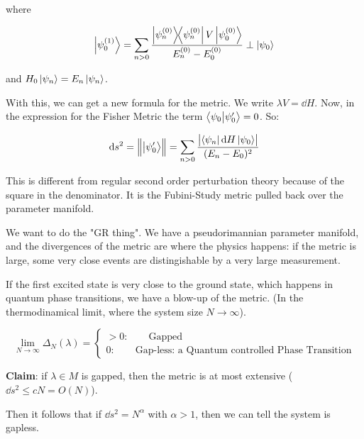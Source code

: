 \documentclass[main_zanardi.tex]{subfiles}
\begin{document}
where

\begin{equation}
  \ket{\psi_0 ^{(1)} } = \sum _{n>0} \frac{\dyad{\psi_n ^{(0)}} V \ket{\psi_0 ^{(0)} }}{E_n ^{(0)}  -  E_0 ^{(0)} } \perp \ket{\psi_0}
\end{equation}

and \(H_0 \ket{\psi_n} = E_n \ket{\psi_n}\).

With this, we can get a new formula for the metric. We write \(\lambda V = \dd{H} \). Now, in the expression for the Fisher Metric the term  \(\braket{\psi_0}{\psi_0 '} = 0 \). So:

\begin{equation}
  \dd{s^2} = \norm{\ket{\psi_0 '}} = \sum _{n>0}  \frac{\abs{\bra{\psi_n} \dd{H} \ket{\psi_0}} }{(E_n - E_0)^2}
\end{equation}

This is different from regular second order perturbation theory because of the square in the denominator. It is the Fubini-Study metric pulled back over the parameter manifold.

We want to do the "GR thing". We have a pseudorimannian parameter manifold, and the divergences of the metric are where the physics happens: if the metric is large, some very close events are distingishable by a very large measurement.

If the first excited state is very close to the ground state, which happens in quantum phase transitions, we have a blow-up of the metric. (In the thermodinamical limit, where the system size \(N \rightarrow \infty\)).

\begin{equation}
   \lim _ {N \rightarrow \infty} \Delta_N(\lambda) = \begin{cases}
     > 0: \qquad \text{Gapped}  \\
     0: \qquad \text{Gap-less: a Quantum controlled Phase Transition}
 \end{cases}
\end{equation}

\textbf{Claim}: if \(\lambda \in M \) is gapped, then the metric is at most extensive (\(\dd{s^2} \leq cN = O(N) \)).

Then it follows that if \(\dd{s^2} = N^\alpha \) with \(\alpha>1\), then we can tell the system is gapless.
\end{document}
